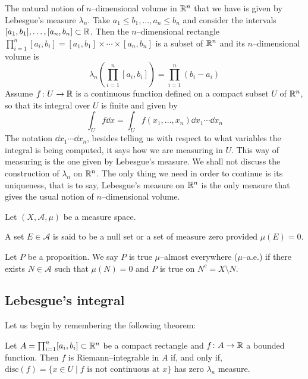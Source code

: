 The natural notion of $n$--dimensional volume in $\mathbb{R}^n$ that we have is given
by Lebesgue's measure $\lambda_n$. Take $a_1 \leq b_1, \ldots, a_n \leq b_n$ and
consider the intervals $[a_1, b_1], \ldots, [a_n, b_n] \subset \mathbb{R}$. Then the
$n$--dimensional rectangle $\prod_{i = 1}^n [a_i, b_i] = [a_1, b_1] \times
\cdots \times [a_n, b_n]$ is a subset of $\mathbb{R}^n$ and its $n$--dimensional
volume is
\[
	\lambda_n\left( \prod_{i = 1}^n [a_i, b_i] \right) = \prod_{i=1}^n (b_i - a_i)
\]
Assume $f \colon U \rightarrow \mathbb{R}$ is a continuous function defined on a
compact subset $U$ of $\mathbb{R}^n$, so that its integral over $U$ is finite and given by
\[
	\int_U f \dd{x} = \int_U f(x_1, \ldots, x_n) \dd{x_1} \cdots \dd{x_n}	
\]
The notation $\dd{x_1} \cdots \dd{x_n}$, besides telling us with respect to what
variables the integral is being computed, it says how we are measuring in $U$.
This way of measuring is the one given by Lebesgue's measure. We shall not
discuss the construction of $\lambda_n$ on $\mathbb{R}^n$. The only thing we need in
order to continue is its uniqueness, that is to say, Lebesgue's measure on
$\mathbb{R}^n$ is the only measure that gives the usual notion of $n$--dimensional
volume.

\begin{definition*}
	Let $(X, \mathcal{A}, \mu)$ be a measure space.
	\begin{enumeratedef}
		\item A set $E \in \mathcal{A}$ is said to be a null set or a set of measure zero provided $\mu(E) = 0$.
		\item Let $P$ be a proposition. We say $P$ is true $\mu$--almost
		everywhere ($\mu$--a.e.) if there exists $N \in \mathcal{A}$ such that
		$\mu(N) = 0$ and $P$ is true on $N^c = X \setminus N$.
	\end{enumeratedef}	
\end{definition*}


\subsection{Lebesgue's integral}

Let us begin by remembering the following theorem:

\begin{theorem}
	Let $A = \prod_{i=1}^n [a_i, b_i] \subset \mathbb{R}^n$ be a compact rectangle
	and $f \colon A \rightarrow \mathbb{R}$ a bounded function. Then $f$ is
	Riemann--integrable in $A$ if, and only if, $\mathrm{disc}(f) = \{ x \in U
	\mid f \text{ is not continuous at } x \}$ has zero $\lambda_n$ measure.
\end{theorem}

